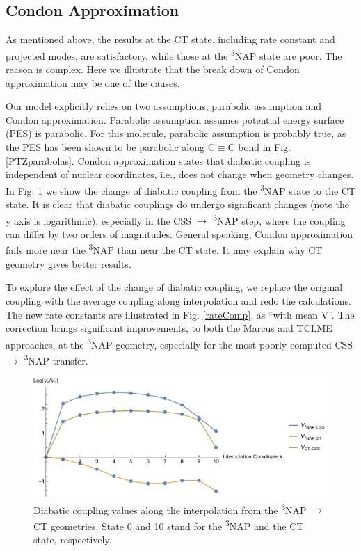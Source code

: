 \subsection{Condon Approximation}\label{sec:condon}

As mentioned above, the results at the CT state, including rate constant and projected modes, are satisfactory, while those at the \textsuperscript{3}NAP state are poor. The reason is complex. Here we illustrate that the break down of Condon approximation may be one of the causes.


Our model explicitly relies on two assumptions, parabolic assumption and Condon approximation. Parabolic assumption assumes potential energy surface (PES) is parabolic. For this molecule, parabolic assumption is probably true, as the PES has been shown to be parabolic along C$\equiv$C bond in Fig. \ref{PTZparabolas}. Condon approximation states that diabatic coupling is independent of nuclear coordinates, i.e., does not change when geometry changes. In Fig. \ref{interCondon} we show the change of diabatic coupling from the \textsuperscript{3}NAP state to the CT state. It is clear that diabatic couplings do undergo significant changes (note the y axis is logarithmic), especially in the CSS $\rightarrow$ \textsuperscript{3}NAP step, where the coupling can differ by two orders of magnitudes. General speaking, Condon approximation fails more near the \textsuperscript{3}NAP than near the CT state. It may explain why CT geometry gives better results.

To explore the effect of the change of diabatic coupling, we replace the original coupling with the average coupling along interpolation and redo the calculations. The new rate constants are illustrated in Fig. \ref{rateComp}, as ``with mean V''. The correction brings significant improvements, to both the Marcus and TCLME approaches, at the \textsuperscript{3}NAP geometry, especially for the most poorly computed  CSS $\rightarrow$ \textsuperscript{3}NAP transfer.

\begin{figure}[t]
\includegraphics[width=\columnwidth]{Chapters/chap4/Images/interpolation.pdf}
\caption{Diabatic coupling values along the interpolation from the \textsuperscript{3}NAP $\rightarrow$ CT geometries. State 0 and 10 stand for the \textsuperscript{3}NAP and the CT state, respectively.\label{interCondon}}
\end{figure}

